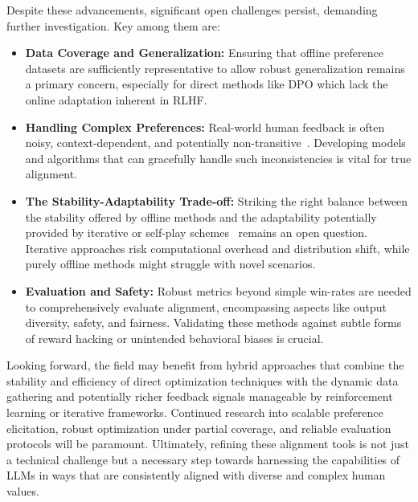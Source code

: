 \documentclass[a4paper,oneside,10pt,ngerman,english]{scrartcl}
\begin{document}
Despite these advancements, significant open challenges persist, demanding further investigation. Key among them are:
\begin{itemize}
    \item \textbf{Data Coverage and Generalization:} Ensuring that offline preference datasets are sufficiently representative to allow robust generalization remains a primary concern, especially for direct methods like DPO which lack the online adaptation inherent in RLHF. %
    \item \textbf{Handling Complex Preferences:} Real-world human feedback is often noisy, context-dependent, and potentially non-transitive~\cite{bib:Tversky1969}. Developing models and algorithms that can gracefully handle such inconsistencies is vital for true alignment.
    \item \textbf{The Stability-Adaptability Trade-off:} Striking the right balance between the stability offered by offline methods and the adaptability potentially provided by iterative or self-play schemes~\cite{bib:swamy2024spo} remains an open question. Iterative approaches risk computational overhead and distribution shift, while purely offline methods might struggle with novel scenarios.
    \item \textbf{Evaluation and Safety:} Robust metrics beyond simple win-rates are needed to comprehensively evaluate alignment, encompassing aspects like output diversity, safety, and fairness. Validating these methods against subtle forms of reward hacking or unintended behavioral biases is crucial.
\end{itemize}

Looking forward, the field may benefit from hybrid approaches that combine the stability and efficiency of direct optimization techniques with the dynamic data gathering and potentially richer feedback signals manageable by reinforcement learning or iterative frameworks. Continued research into scalable preference elicitation, robust optimization under partial coverage, and reliable evaluation protocols will be paramount. Ultimately, refining these alignment tools is not just a technical challenge but a necessary step towards harnessing the capabilities of LLMs in ways that are consistently aligned with diverse and complex human values.


\end{document}
